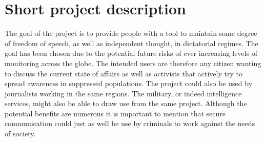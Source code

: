 \section{Short project description}
The goal of the project is to provide people with a tool to maintain some degree of freedom of speech, as well as independent thought, in dictatorial regimes. 
The goal has been chosen due to the potential future risks of ever increasing levels of monitoring across the globe. The intended users are therefore any citizen wanting to discuss the current state of affairs as well as activists that actively try to spread awareness in suppressed populations. The project could also be used by journalists working in the same regions. The military, or indeed intelligence services, might also be able to draw use from the same project. Although the potential benefits are numerous it is important to mention that secure communication could just as well be use by criminals to work against the needs of society.